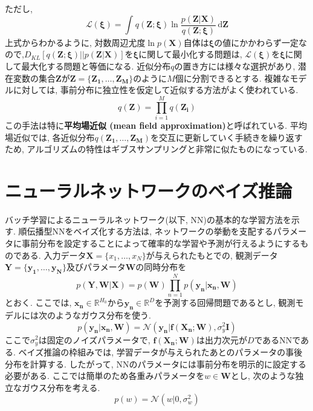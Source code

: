 \documentclass[twocolumn]{jarticle}
\begin{document}
ただし,
\begin{equation}
  \mathcal{L}(\bm {\xi}) = \int_{}^{} q(\bm {Z;\xi}) \ln\frac{p(\bm {Z|X})}{q(\bm {Z;\xi} )} \,\mathrm{d}{\bm {Z}}
\end{equation}
上式からわかるように, 対数周辺尤度${\ln p(\bm {X})}$自体は${\bm {\xi}}$の値にかかわらず一定なので,${D_{KL}[q(\bm {Z;\xi})||p(\bm {Z|X})]}$を${\bm {\xi}}$に関して最小化する問題は, ${\mathcal{L} ({\bm {\xi}})}$を${\bm {\xi}}$に関して最大化する問題と等価になる. 近似分布${q}$の置き方には様々な選択があり, 潜在変数の集合${\bm {Z}}$が${\bm {Z} = \{ \bm{Z_1, \ldots, Z_M}\}}$のように${M}$個に分割できるとする. 複雑なモデルに対しては, 事前分布に独立性を仮定して近似する方法がよく使われている.
\begin{equation}
  q(\bm {Z}) = \prod_{i=1}^{M} q(\bm {Z_i})
\end{equation}
この手法は特に{\bf 平均場近似 (mean field approximation)}と呼ばれている. 平均場近似では, 各近似分布${q(\bm {Z_1}, \ldots, \bm {Z_M})}$を交互に更新していく手続きを繰り返すため, アルゴリズムの特性はギブスサンプリングと非常に似たものになっている.

\section{ニューラルネットワークのベイズ推論}
バッチ学習によるニューラルネットワーク(以下, NN)の基本的な学習方法を示す. 順伝播型NNをベイズ化する方法は, ネットワークの挙動を支配するパラメータに事前分布を設定することによって確率的な学習や予測が行えるようにするものである.
入力データ${\bm {X} = \{x_1, \ldots, x_N\}}$が与えられたもとでの, 観測データ${\bm {Y} = \{\bm {y_1, \ldots, y_N}\}}$及びパラメータ${\bm {W}}$の同時分布を
\begin{equation}
  p(\bm {Y, W| X}) = p(\bm {W})\prod_{n=1}^{N} p(\bm {y_n|x_n, W})
\end{equation}
とおく. ここでは, ${\bm {x_n} \in \mathbb{R}^{H_0}}$から${\bm {y_n} \in \mathbb{R}^{D}}$を予測する回帰問題であるとし, 観測モデルには次のようなガウス分布を使う.
\begin{equation}
  p(\bm {y_n | x_n, W}) = \mathcal{N} (\bm {y_n|f(X_n;W)}, \sigma_y^2 \bm {I})
\end{equation}
ここで${\sigma_y^2}$は固定のノイズパラメータで, ${\bm {f(X_n;W)}}$は出力次元が${D}$であるNNである. ベイズ推論の枠組みでは, 学習データが与えられたあとのパラメータの事後分布を計算する. したがって, NNのパラメータには事前分布を明示的に設定する必要がある. ここでは簡単のため各重みパラメータを${w \in \bm {W}}$とし, 次のような独立なガウス分布を考える.
\begin{equation}
  p(w) = \mathcal{N}(w|0, \sigma_w^2)
\end{equation}
\end{document}
